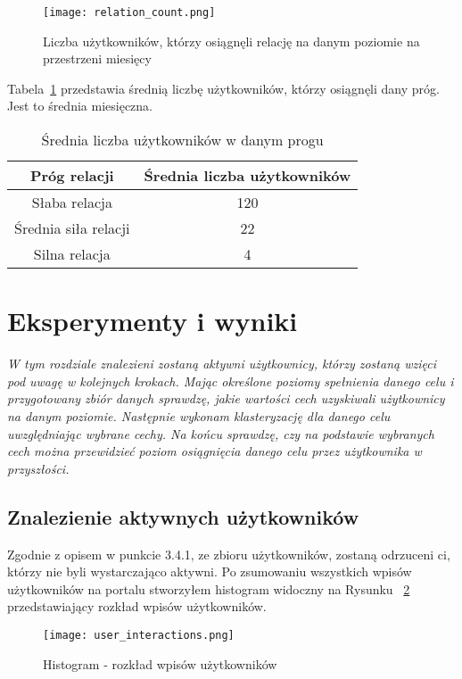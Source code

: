 \documentclass[polish,12pt]{aghthesis}
\begin{document}
\begin{figure}[ht]
    \centering
    \texttt{[image: relation\_count.png]}
    \caption{Liczba użytkowników, którzy osiągnęli relację na danym poziomie na przestrzeni miesięcy}
    \label{fig:rel_count}
\end{figure}

\FloatBarrier

Tabela~\ref{tab:relation_count2} przedstawia średnią liczbę użytkowników, którzy osiągnęli dany próg. Jest to średnia miesięczna.

\begin{table}[h]
\centering
\begin{tabular}{|c|c|}
\hline
\textbf{Próg relacji} & \textbf{Średnia liczba użytkowników} \\
\hline
Słaba relacja & 120 \\
\hline
Średnia siła relacji & 22 \\
\hline
Silna relacja & 4 \\
\hline
\end{tabular}
\caption{Średnia liczba użytkowników w danym progu}
\label{tab:relation_count2}
\end{table}

\FloatBarrier


\newpage
\section{Eksperymenty i wyniki}
\emph{W tym rozdziale znalezieni zostaną aktywni użytkownicy, którzy zostaną wzięci pod uwagę w kolejnych krokach. Mając określone poziomy spełnienia danego celu i przygotowany zbiór danych sprawdzę, jakie wartości cech uzyskiwali użytkownicy na danym poziomie. Następnie wykonam klasteryzację dla danego celu uwzględniając wybrane cechy. Na końcu sprawdzę, czy na podstawie wybranych cech można przewidzieć poziom osiągnięcia danego celu przez użytkownika w przyszłości.}

\subsection{Znalezienie aktywnych użytkowników}
Zgodnie z opisem w punkcie 3.4.1, ze zbioru użytkowników, zostaną odrzuceni ci, którzy nie byli wystarczająco aktywni. Po zsumowaniu wszystkich wpisów użytkowników na portalu stworzyłem histogram widoczny na Rysunku ~\ref{fig:hist_active} przedstawiający rozkład wpisów użytkowników.

\begin{figure}[ht]
    \centering
    \texttt{[image: user\_interactions.png]}
    \caption{Histogram - rozkład wpisów użytkowników}
    \label{fig:hist_active}
\end{figure}
\end{document}

